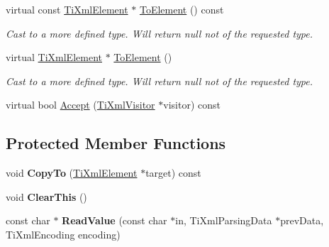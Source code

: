 \begin{DoxyCompactItemize}
\item 
\hypertarget{class_ti_xml_element_ac5b8d0e25fa23fd9acbb6d146082901c}{virtual const \hyperlink{class_ti_xml_element}{Ti\-Xml\-Element} $\ast$ \hyperlink{class_ti_xml_element_ac5b8d0e25fa23fd9acbb6d146082901c}{To\-Element} () const }\label{class_ti_xml_element_ac5b8d0e25fa23fd9acbb6d146082901c}

\begin{DoxyCompactList}\small\item\em Cast to a more defined type. Will return null not of the requested type. \end{DoxyCompactList}\item 
\hypertarget{class_ti_xml_element_a9def86337ea7a755eb41cac980f60c7a}{virtual \hyperlink{class_ti_xml_element}{Ti\-Xml\-Element} $\ast$ \hyperlink{class_ti_xml_element_a9def86337ea7a755eb41cac980f60c7a}{To\-Element} ()}\label{class_ti_xml_element_a9def86337ea7a755eb41cac980f60c7a}

\begin{DoxyCompactList}\small\item\em Cast to a more defined type. Will return null not of the requested type. \end{DoxyCompactList}\item 
virtual bool \hyperlink{class_ti_xml_element_a71a81b2afb0d42be1543d1c404dee6f5}{Accept} (\hyperlink{class_ti_xml_visitor}{Ti\-Xml\-Visitor} $\ast$visitor) const 
\end{DoxyCompactItemize}
\subsection*{Protected Member Functions}
\begin{DoxyCompactItemize}
\item 
\hypertarget{class_ti_xml_element_a9e0c1983b840de4134f1f6bf7af00b0f}{void {\bfseries Copy\-To} (\hyperlink{class_ti_xml_element}{Ti\-Xml\-Element} $\ast$target) const }\label{class_ti_xml_element_a9e0c1983b840de4134f1f6bf7af00b0f}

\item 
\hypertarget{class_ti_xml_element_a5670933ec2d7d9763b9891acc05d7f7d}{void {\bfseries Clear\-This} ()}\label{class_ti_xml_element_a5670933ec2d7d9763b9891acc05d7f7d}

\item 
\hypertarget{class_ti_xml_element_ad072ea0e78226a52f0a3872fa03bc29c}{const char $\ast$ {\bfseries Read\-Value} (const char $\ast$in, Ti\-Xml\-Parsing\-Data $\ast$prev\-Data, Ti\-Xml\-Encoding encoding)}\label{class_ti_xml_element_ad072ea0e78226a52f0a3872fa03bc29c}

\end{DoxyCompactItemize}

